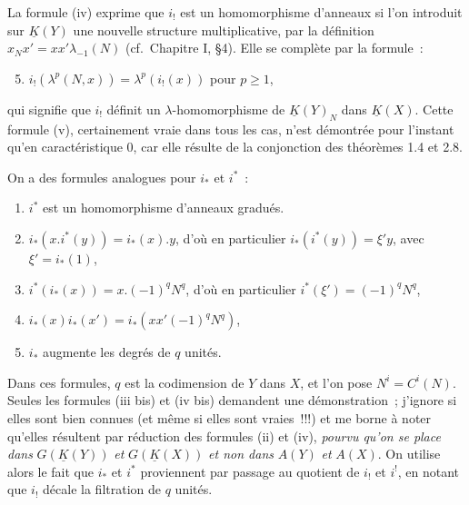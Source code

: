 La
formule (iv) exprime que $i_!$ est un homomorphisme d'anneaux si l'on introduit sur $\underline K(Y)$ une nouvelle structure multiplicative, par la définition $x_N x'=xx'\lambda_{-1}(N)$ (cf.\ Chapitre I, \S 4). Elle se complète par la formule~:
\begin{enumerate}[label=(\roman*)]
\setcounter{enumi}{4}
\item $i_!(\lambda^p(N,x))=\lambda^p(i_!(x))$ pour $p\geq1$,
\end{enumerate}
qui signifie que $i_!$ définit un $\lambda$-homomorphisme de $\underline K(Y)_N$ dans $\underline K(X)$. Cette formule (v), certainement vraie dans tous les cas, n'est démontrée pour l'instant qu'en caractéristique $0$, car elle résulte de la conjonction des théorèmes 1.4 et 2.8.

On a des formules analogues pour $i_*$ et $i^*$~:
\begin{enumerate}[label=(\roman* bis)]
\item $i^*$ est un homomorphisme d'anneaux gradués.
\item $i_*(x.i^*(y))=i_*(x).y$, d'où en particulier $i_*(i^*(y))=\xi' y$, avec $\xi'=i_*(1)$,
\item $i^*(i_*(x))=x.(-1)^q N^q$, d'où en particulier $i^*(\xi')=(-1)^q N^q$,
\item $i_*(x)i_*(x')=i_*(xx'(-1)^q N^q)$,
\item $i_*$ augmente les degrés de $q$ unités.
\end{enumerate}

Dans ces formules, $q$ est la codimension de $Y$ dans $X$, et l'on pose $N^i=C^i(N)$. Seules les formules (iii bis) et (iv bis) demandent une démonstration~; j'ignore si elles sont bien connues (et même si elles sont vraies~!!!) et me borne à noter qu'elles résultent par réduction des formules (ii) et (iv), \emph{pourvu qu'on se place dans} $G(\underline K(Y))$ \emph{et} $G(\underline K(X))$ \emph{et non dans} $A(Y)$ \emph{et} $A(X)$. On utilise alors le fait que $i_*$ et $i^*$ proviennent par passage au quotient de $i_!$ et $i^!$, en notant que $i_!$ décale la filtration de $q$ unités.

